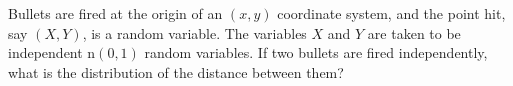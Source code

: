 \documentclass[12pt,letterpaper]{exam}
\begin{document}
\begin{questions}
	\begin{solution}
		
	\end{solution}

	\setcounter{question}{51}
	\question 
	Bullets are fired at the origin of an \((x, y)\) coordinate system, and the point hit, say \((X, Y )\), is a random variable. The variables \(X\) and \(Y\) are taken to be independent n\((0, 1)\) random variables. If two bullets are fired independently, what is the distribution of the distance between them?
	
	\begin{solution}
		
	\end{solution}

\end{questions}
\end{document}

